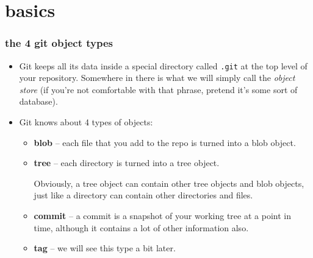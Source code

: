 \documentclass[presentation]{beamer}
\begin{document}
\section{basics}
\label{sec-2}
\begin{frame}
\frametitle{the 4 git object types}
\label{sec-2-1}


\begin{itemize}
\item Git keeps all its data inside a special directory called \texttt{.git} at
  the top level of your repository.  Somewhere in there is what we
  will simply call the \emph{object store} (if you're not comfortable with
  that phrase, pretend it's some sort of database).
\item Git knows about 4 types of objects:
\begin{itemize}
\item \textbf{blob} -- each file that you add to the repo is turned into a blob
    object.
\item \textbf{tree} -- each directory is turned into a tree object.

    Obviously, a tree object can contain other tree objects and blob objects,
    just like a directory can contain other directories and files.
\item \textbf{commit} -- a commit is a snapshot of your working tree at a point in
    time, although it contains a lot of other information also.
\item \textbf{tag} -- we will see this type a bit later.
\end{itemize}
\end{itemize}
\end{frame}
\end{document}
